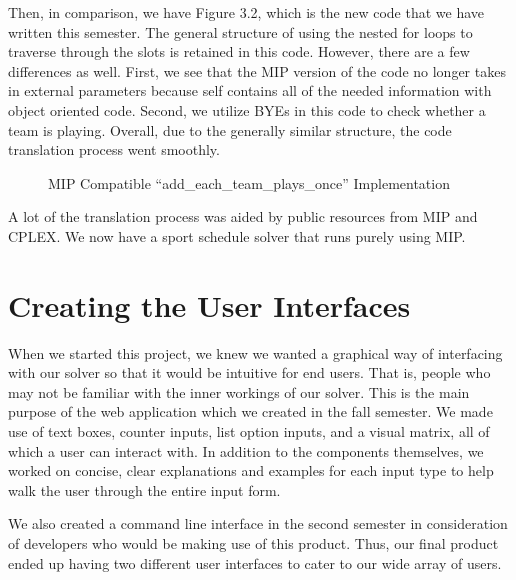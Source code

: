 \documentclass[book]{hmcclinic}
\begin{document}
Then, in comparison, we have Figure 3.2, which is the new code that we have written this semester. The general structure of using the nested for loops to traverse through the slots is retained in this code. However, there are a few differences as well. First, we see that the MIP version of the code no longer takes in external parameters because self contains all of the needed information with object oriented code. Second, we utilize BYEs in this code to check whether a team is playing. Overall, due to the generally similar structure, the code translation process went smoothly. 

\begin{figure}[h]
    \centering
    \caption{MIP Compatible “add\_each\_team\_plays\_once” Implementation}
\end{figure}

A lot of the translation process was aided by public resources from MIP and CPLEX. We now have a sport schedule solver that runs purely using MIP.




\section{Creating the User Interfaces}
When we started this project, we knew we wanted a graphical way of interfacing with our solver so that it would be intuitive for end users. That is, people who may not be familiar with the inner workings of our solver. This is the main purpose of the web application which we created in the fall semester. We made use of text boxes, counter inputs, list option inputs, and a visual matrix, all of which a user can interact with. In addition to the components themselves, we worked on concise, clear explanations and examples for each input type to help walk the user through the entire input form.

We also created a command line interface in the second semester in consideration of developers who would be making use of this product. Thus, our final product ended up having two different user interfaces to cater to our wide array of users. 
\end{document}
